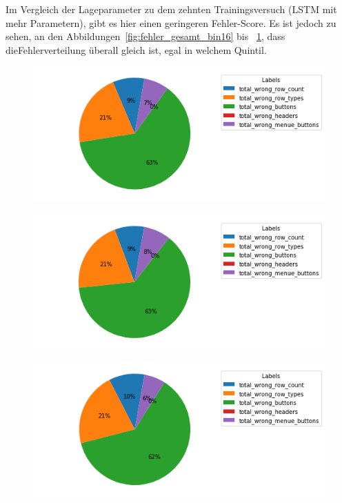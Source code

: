 \documentclass[pdftex,a4paper,halfparskip, article]{scrartcl}
\begin{document}
Im Vergleich der Lageparameter zu dem zehnten Trainingsversuch (LSTM mit mehr Parametern), gibt es hier einen geringeren Fehler-Score. Es ist jedoch zu sehen, an den Abbildungen~\ref{fig:fehler_gesamt_bin16} bis ~\ref{fig:fehler_schlechteste20_bin16}, dass dieFehlerverteilung überall gleich ist, egal in welchem Quintil.

\begin{figure}
\centering
\begin{minipage}{.5\textwidth}
  \centering
  \includegraphics[width=1\linewidth]{predictions_bin16_total_error_types_pie_chart}
  \label{fig:fehler_gesamt_bin16}
\end{minipage}%
\begin{minipage}{.5\textwidth}
  \centering
  \includegraphics[width=1\linewidth]{predictions_bin16_excluded_p80_error_types_pie_chart}
  \label{fig:fehler_beste80_bin16}
\end{minipage}
\begin{minipage}{.5\textwidth}
  \centering
   \includegraphics[width=1\linewidth]{predictions_bin16_p80_error_types_pie_chart}
  \label{fig:fehler_schlechteste20_bin16}
\end{minipage}
\end{figure}
\end{document}
